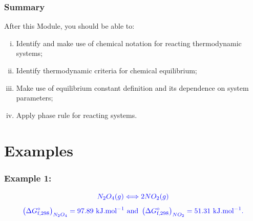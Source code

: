 \documentclass[10pt,compress,unknownkeysallowed]{beamer}
\begin{document}
\begin{frame}
 \frametitle{Summary}
   After this Module, you should be able to:
   \begin{enumerate}[(i)]
     \item Identify and make use of chemical notation for reacting thermodynamic systems;
     \item Identify thermodynamic criteria for chemical equilibrium;
     \item Make use of equilibrium constant definition and its dependence on system parameters;
     \item Apply phase rule for reacting systems.
   \end{enumerate}
\end{frame}

\section{Examples}

\begin{frame}
 \frametitle{Example 1:}
        \begin{displaymath}
           \textcolor{blue}{N_{2}O_{4} (g) \Longleftrightarrow 2 NO_{2} (g)}
        \end{displaymath}
        \begin{displaymath}
          \textcolor{blue}{ \left(\Delta G^{\circ}_{\text{f,298}}\right)_{N_{2}O_{4}} = 97.89 \text{ kJ.mol}^{-1} \text{ and } \left(\Delta G^{\circ}_{\text{f,298}}\right)_{NO_{2}} = 51.31 \text{ kJ.mol}^{-1}.}
        \end{displaymath}
     
\end{frame}
\end{document}
